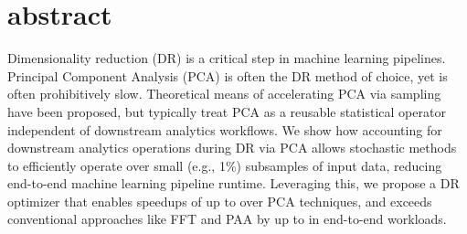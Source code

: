 \section*{abstract}
Dimensionality reduction (DR) is a critical step in machine learning pipelines. 
Principal Component Analysis (PCA) is often the DR method of choice, yet is often prohibitively slow.
Theoretical means of accelerating PCA via sampling have been proposed, but typically treat PCA as a reusable statistical operator independent of downstream analytics workflows.
We show how accounting for downstream analytics operations during DR via PCA allows stochastic methods to efficiently operate over small (e.g., 1\%) subsamples of input data, reducing end-to-end machine learning pipeline runtime. 
Leveraging this, we propose a DR optimizer that enables speedups of up to \red{$5\times$} over  PCA techniques, and exceeds conventional approaches like FFT and PAA by up to \red{$16\times$} in end-to-end workloads.






